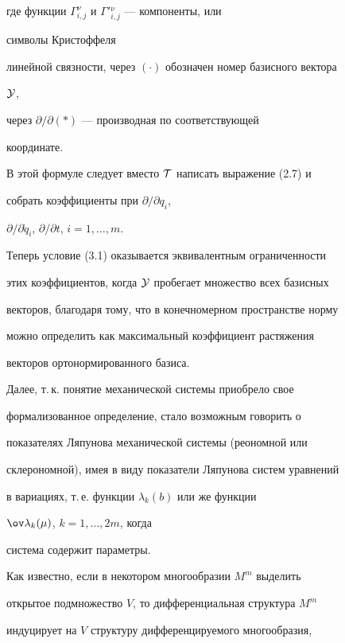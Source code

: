где функции $\Gamma^\nu_{i,j}$ и $\Gamma'{}^\nu_{i,j}$ --- компоненты, или 


символы Кристоффеля 


линейной связности, через $(\cdot)$ обозначен номер базисного вектора 


$\cal Y$, 


через $\partial/\partial(\ast)$ --- производная по соответствующей 


координате. 


 


 


В этой формуле следует вместо $\cal T$ написать выражение (2.7) и 


собрать коэффициенты при $\partial/\partial q_i$, 


$\partial/\partial\Dot q_i$, $\partial/\partial t$, $i=1,\dotsc,m$. 


Теперь условие (3.1) оказывается эквивалентным ограниченности 


этих коэффициентов, когда $\cal Y$ пробегает множество всех базисных 


векторов, благодаря тому, что в конечномерном пространстве норму 


можно определить как максимальный коэффициент растяжения 


векторов ортонормированного базиса. 


 


Далее, т.\,к. понятие механической системы приобрело свое 


формализованное определение, стало возможным говорить о 


показателях Ляпунова механической системы (реономной или 


склерономной), имея в виду показатели Ляпунова систем уравнений 


в вариациях, т.\,е. функции $\lambda_k(b)$ или же функции 


$\ov\lambda_k(\mu)$, $k=1,\dotsc,2m$, когда 


система содержит параметры. 


 


Как известно, если в некотором многообразии $M^m$ выделить 


открытое подмножество $V$, то дифференциальная структура $M^m$ 


индуцирует на $V$ структуру дифференцируемого многообразия, 


